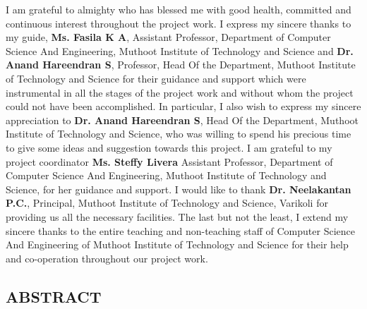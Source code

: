\documentclass[a4paper,12pt]{report}
\begin{document}
\noindent
\newline
I am grateful to almighty who has blessed me with good health, committed and continuous interest throughout the project work.
\newline
\newline
I express my sincere thanks to my guide, \textbf{Ms. Fasila K A}, Assistant Professor, Department of Computer Science And Engineering, Muthoot Institute of Technology and Science and \textbf{Dr. Anand Hareendran S}, Professor, Head Of the Department, Muthoot Institute of Technology and Science for their guidance and support which were instrumental in all the stages of the project work and without whom the project could not have been accomplished.
\newline
\newline
In particular, I also wish to express my sincere appreciation to \textbf{Dr. Anand Hareendran S}, Head Of the Department, Muthoot Institute of Technology and Science, who was willing to spend his precious time to give some ideas and suggestion towards this project.
\newline
\newline
I am grateful to my project coordinator \textbf{Ms. Steffy Livera } Assistant Professor, Department of Computer Science And Engineering, Muthoot Institute of Technology and Science, for her guidance and support.
\newline
\newline
I would like to thank \textbf{Dr. Neelakantan P.C.}, Principal, Muthoot Institute of Technology and Science, Varikoli for providing us all the necessary facilities.
\newline
\newline
The last but not the least, I extend my sincere thanks to the entire teaching and non-teaching staff of Computer Science And Engineering of Muthoot Institute of Technology and Science for their help and co-operation throughout our project work.

\begin{flushright}
    \vspace{10 mm}

\end{flushright}


\newpage
{}
\setcounter{page}{2}
\thispagestyle{plain}
\begin{center}
    \section{ABSTRACT}
\end{center}
\end{document}
